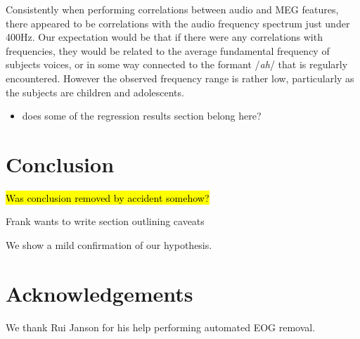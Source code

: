 \documentclass[a4paper]{article}
\newcommand{\DK}[1]{{\small \textcolor{blue}{\hl{#1}}}}
\begin{document}
Consistently when performing correlations between audio and MEG features, there appeared to be correlations with the audio frequency spectrum just under 400Hz. Our expectation would be that if there were any correlations with frequencies, they would be related to the average fundamental frequency of subjects voices, or in some way connected to the formant /{\em ah}/ that is regularly encountered. However the observed frequency range is rather low, particularly as the subjects are children and adolescents.

\begin{itemize}
\item does some of the regression results section belong here?
\end{itemize}

\section{Conclusion}

\DK{Was conclusion removed by accident somehow?}

Frank wants to write section outlining caveats

We show a mild confirmation of our hypothesis.

\section{Acknowledgements}

We thank Rui Janson for his help performing automated EOG removal.





\end{document}
